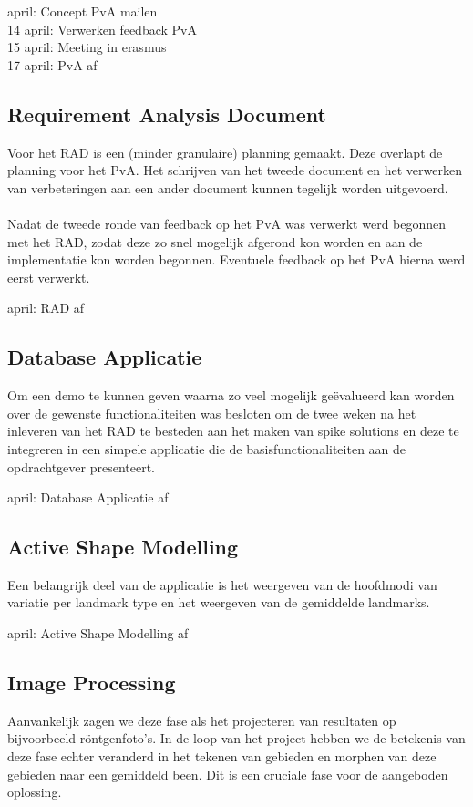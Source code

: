  april: Concept PvA mailen \\
14 april: Verwerken feedback PvA \\
15 april: Meeting in erasmus \\
17 april: PvA af

\subsection{Requirement Analysis Document}
Voor het RAD is een (minder granulaire) planning gemaakt. Deze overlapt
de planning voor het PvA. Het schrijven van het tweede document en
het verwerken van verbeteringen aan een ander document kunnen tegelijk worden
uitgevoerd.
\\
\\
Nadat de tweede ronde van feedback op het PvA was verwerkt werd begonnen met
het RAD, zodat deze zo snel mogelijk afgerond kon worden en aan de
implementatie kon worden begonnen. Eventuele feedback op het PvA hierna werd
eerst verwerkt.

 april: RAD af

\subsection{Database Applicatie}
Om een demo te kunnen geven waarna zo veel mogelijk ge\"{e}valueerd kan worden
over de gewenste functionaliteiten was besloten om de twee weken na het
inleveren van het RAD te besteden aan het maken van spike solutions en deze te
integreren in een simpele applicatie die de basisfunctionaliteiten aan de
opdrachtgever presenteert.

 april: Database Applicatie af

\subsection{Active Shape Modelling}
Een belangrijk deel van de applicatie is het weergeven van de hoofdmodi van
variatie per landmark type en het weergeven van de gemiddelde landmarks.

 april: Active Shape Modelling af

\subsection{Image Processing}
Aanvankelijk zagen we deze fase als het projecteren van resultaten op
bijvoorbeeld r\"{o}ntgenfoto's. In de loop van het project hebben we de
betekenis van deze fase echter veranderd in het tekenen van gebieden en
morphen van deze gebieden naar een gemiddeld been. Dit is een cruciale fase
voor de aangeboden oplossing.

